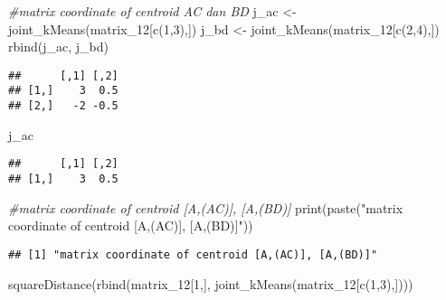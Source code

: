 \documentclass[
]{article}
\newenvironment{Shaded}{\begin{snugshade}}{\end{snugshade}}
\newcommand{\CommentTok}[1]{\textcolor[rgb]{0.56,0.35,0.01}{\textit{#1}}}
\newcommand{\DecValTok}[1]{\textcolor[rgb]{0.00,0.00,0.81}{#1}}
\newcommand{\FunctionTok}[1]{\textcolor[rgb]{0.00,0.00,0.00}{#1}}
\newcommand{\NormalTok}[1]{#1}
\newcommand{\OtherTok}[1]{\textcolor[rgb]{0.56,0.35,0.01}{#1}}
\newcommand{\StringTok}[1]{\textcolor[rgb]{0.31,0.60,0.02}{#1}}
\begin{document}
\begin{Shaded}
\begin{Highlighting}[]
\CommentTok{\#matrix coordinate of centroid AC dan BD}
\NormalTok{j\_ac }\OtherTok{\textless{}{-}} \FunctionTok{joint\_kMeans}\NormalTok{(matrix\_12[}\FunctionTok{c}\NormalTok{(}\DecValTok{1}\NormalTok{,}\DecValTok{3}\NormalTok{),])}
\NormalTok{j\_bd }\OtherTok{\textless{}{-}} \FunctionTok{joint\_kMeans}\NormalTok{(matrix\_12[}\FunctionTok{c}\NormalTok{(}\DecValTok{2}\NormalTok{,}\DecValTok{4}\NormalTok{),])}
\FunctionTok{rbind}\NormalTok{(j\_ac, j\_bd)}
\end{Highlighting}
\end{Shaded}

\begin{verbatim}
##      [,1] [,2]
## [1,]    3  0.5
## [2,]   -2 -0.5
\end{verbatim}

\begin{Shaded}
\begin{Highlighting}[]
\NormalTok{j\_ac}
\end{Highlighting}
\end{Shaded}

\begin{verbatim}
##      [,1] [,2]
## [1,]    3  0.5
\end{verbatim}

\begin{Shaded}
\begin{Highlighting}[]
\CommentTok{\#matrix coordinate of centroid [A,(AC)], [A,(BD)]}
\FunctionTok{print}\NormalTok{(}\FunctionTok{paste}\NormalTok{(}\StringTok{"matrix coordinate of centroid [A,(AC)], [A,(BD)]"}\NormalTok{))}
\end{Highlighting}
\end{Shaded}

\begin{verbatim}
## [1] "matrix coordinate of centroid [A,(AC)], [A,(BD)]"
\end{verbatim}

\begin{Shaded}
\begin{Highlighting}[]
\FunctionTok{squareDistance}\NormalTok{(}\FunctionTok{rbind}\NormalTok{(matrix\_12[}\DecValTok{1}\NormalTok{,],}
                     \FunctionTok{joint\_kMeans}\NormalTok{(matrix\_12[}\FunctionTok{c}\NormalTok{(}\DecValTok{1}\NormalTok{,}\DecValTok{3}\NormalTok{),])))}
\end{Highlighting}
\end{Shaded}
\end{document}
